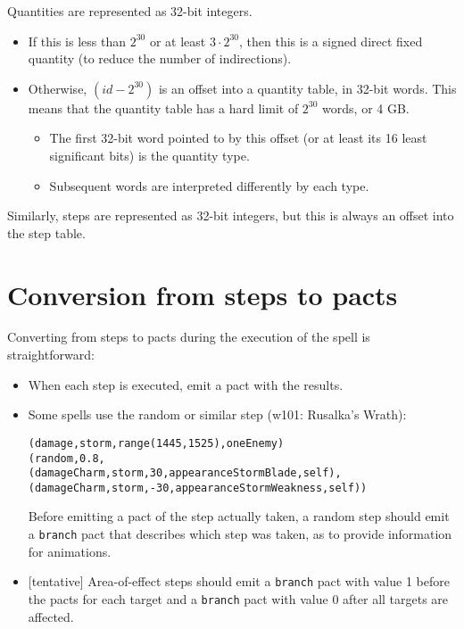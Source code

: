 \documentclass{article}
\begin{document}
Quantities are represented as 32-bit integers.

\begin{itemize}
  \item If this is less than $2^{30}$ or at least $3 \cdot 2^{30}$, then this is a signed direct fixed quantity (to reduce the number of indirections).
  \item Otherwise, $(id - 2^{30})$ is an offset into a quantity table, in 32-bit words. This means that the quantity table has a hard limit of $2^{30}$ words, or 4 GB.
  \begin{itemize}
    \item The first 32-bit word pointed to by this offset (or at least its 16 least significant bits) is the quantity type.
    \item Subsequent words are interpreted differently by each type.
  \end{itemize}
\end{itemize}

Similarly, steps are represented as 32-bit integers, but this is always an offset into the step table.

\section{Conversion from steps to pacts}

Converting from steps to pacts during the execution of the spell is straightforward:

\begin{itemize}
  \item When each step is executed, emit a pact with the results.
  \item Some spells use the random or similar step (w101: Rusalka's Wrath):
\begin{alltt}
(damage, storm, range(1445, 1525), oneEnemy)
(random, 0.8,
  (damageCharm, storm, 30, appearanceStormBlade, self),
  (damageCharm, storm, -30, appearanceStormWeakness, self))
\end{alltt}
  Before emitting a pact of the step actually taken, a random step should emit a \texttt{branch} pact that describes which step was taken, as to provide information for animations.
  \item {[tentative]} Area-of-effect steps should emit a \texttt{branch} pact with value 1 before the pacts for each target and a \texttt{branch} pact with value 0 after all targets are affected.
\end{itemize}
\end{document}
